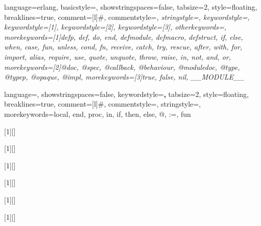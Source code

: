  {language=erlang,
  basicstyle=\footnotesize\ttfamily,
  showstringspaces=false,
  tabsize=2,
  style=floating,
  breaklines=true,
  comment=[l]\#,
  commentstyle=\color{gray}\itshape\ttfamily,
  stringstyle=\color{OliveGreen}\ttfamily,
  keywordstyle={\ttfamily},
  keywordstyle=[1]{\color{ElixirPurple}\bfseries},
  keywordstyle=[2]{\color{ElixirPurple}\bfseries},
  keywordstyle=[3]{\color{ElixirPurple}\bfseries},
  otherkeywords={},
  morekeywords=[1]{defp, def, do, end, defmodule, defmacro, defstruct, if, else, when, case,
    fun, unless, cond, fn, receive, catch, try, rescue, after, with, for, import, alias,
    require, use, quote, unquote, throw, raise, in, not, and, or},
  morekeywords=[2]{@doc, @spec, @callback, @behaviour, @moduledoc, @type, @typep, @opaque,
    @impl},
  morekeywords=[3]{true, false, nil, __MODULE__}
}

 {language={},
  showstringspaces=false,
  keywordstyle=\color{magenta}\ttfamily\textbf,
  tabsize=2,
  style=floating,
  breaklines=true,
  comment=[l]\#,
  commentstyle=\color{gray}\ttfamily,
  stringstyle=\color{OliveGreen}\ttfamily,
  morekeywords={local, end, proc, in, if, then, else, @, :=, fun}
}

\usepackage{array}
\renewcommand*{\arraystretch}{1.7}


[1][]
 {\lstset{style=java,#1}}{}  

[1][]
 {\lstset{style=tjava,#1}}{}  


[1][]
 {\lstset{style=elixir,#1}}{}

[1][]
 {\lstset{style=smalltalk,#1}}{}  
 
[1][]
 {\lstset{style=mozart,#1}}{}  

[1][]
 {\lstset{numbers=left,escapechar=`,caption=b,basicstyle=\small\ttfamily,#1}}{}
 
\newcommand{\javacode}[1]{\textrm{\texttt{#1}}}
\def\javacode{\lstinline[style=java]}

\newcommand{\stcode}[1]{\textrm{\texttt{#1}}}
\def\lrpcode{\lstinline[style=smalltalk]}

\newcommand{\scode}[1]{\textrm{\texttt{#1}}}
\def\scode{\lstinline[style=elixir]}

\newcommand{\console}[1]{\textrm{\small\ttfamily{#1}}}
\def\console{\lstinline[style=lrp]} 

\newcommand{\mozcode}[1]{\textrm{\small\ttfamily{#1}}}
\def\console{\lstinline[style=mozart]} 

%Commands
\newcommand{\eg}{\emph{e.g.,}~}
\newcommand{\ie}{\emph{i.e.,}~}
\newcommand{\cf}{\emph{cf.}~}

%

\endinput

